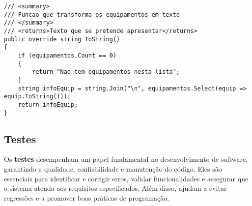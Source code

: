 \documentclass[11pt]{scrartcl} %
\begin{document}
\begin{lstlisting}[language={[Sharp]C}, caption={Exemplo de utilização do LINQ}, label={Utilização do LINQ}]
        /// <summary>
/// Funcao que transforma os equipamentos em texto
/// </summary>
/// <returns>Texto que se pretende apresentar</returns>
public override string ToString()
{
	if (equipamentos.Count == 0)
	{
		return "Nao tem equipamentos nesta lista";
	}
	string infoEquip = string.Join("\n", equipamentos.Select(equip => equip.ToString()));
	return infoEquip;
}
\end{lstlisting}

\subsection{Testes}

Os \textbf{testes} desempenham um papel fundamental no desenvolvimento de software, garantindo a qualidade, confiabilidade e manutenção do código. Eles são essenciais para identificar e corrigir erros, validar funcionalidades e assegurar que o sistema atenda aos requisitos especificados. Além disso, ajudam a evitar regressões e a promover boas práticas de programação.
\end{document}
